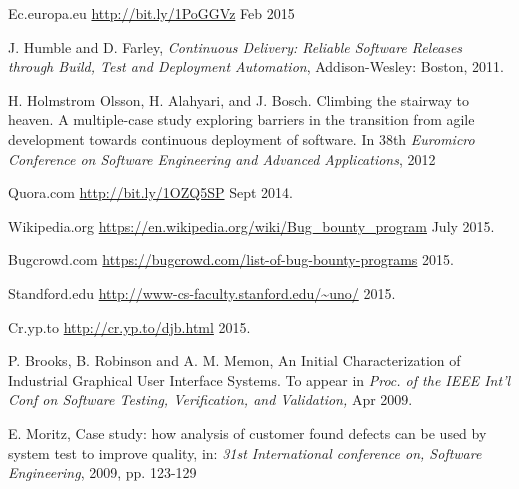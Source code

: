 \documentclass[conference]{IEEEtran}
\begin{document}

%
%
\begin{thebibliography}{1}

Ec.europa.eu \url{http://bit.ly/1PoGGVz} Feb 2015

J.  Humble  and  D.  Farley,  \emph{Continuous  Delivery:  Reliable  Software Releases  through  Build,  Test  and  Deployment  Automation},  Addison-Wesley: Boston, 2011. 

H. Holmstrom Olsson, H. Alahyari, and J. Bosch. Climbing the stairway to heaven. A multiple-case study exploring barriers in the transition from agile development towards continuous deployment of software. In 38th \emph{Euromicro Conference on Software Engineering and Advanced Applications}, 2012

Quora.com \url{http://bit.ly/1OZQ5SP} Sept 2014.

Wikipedia.org \url{https://en.wikipedia.org/wiki/Bug_bounty_program} July 2015.

Bugcrowd.com \url{https://bugcrowd.com/list-of-bug-bounty-programs} 2015.

Standford.edu \url{http://www-cs-faculty.stanford.edu/~uno/} 2015. 

Cr.yp.to \url{http://cr.yp.to/djb.html} 2015.

P. Brooks, B. Robinson and A. M. Memon,  An Initial Characterization of Industrial Graphical User Interface Systems. To appear in \emph{Proc. of the IEEE Int'l Conf on Software Testing, Verification, and Validation,} Apr 2009.

E. Moritz, Case study: how analysis of customer found defects can be used by system test to improve quality, in: \emph{31st International conference on, Software Engineering}, 2009, pp. 123-129


\end{thebibliography}
\end{document}
